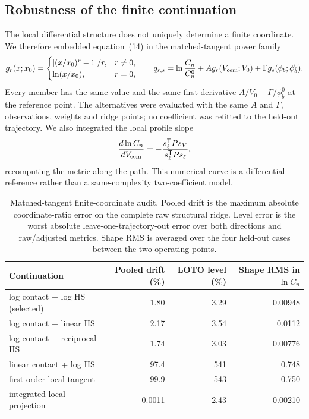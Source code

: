 
\subsection{Robustness of the finite continuation}

The local differential structure does not uniquely determine a finite
coordinate.  We therefore embedded equation~(14) in the matched-tangent
power family
\begin{equation}
 g_r(x;x_0)=
 \begin{cases}
 [(x/x_0)^r-1]/r, & r\ne0,\\
 \ln(x/x_0), & r=0,
 \end{cases}
 \qquad
 q_{r,s}=\ln\frac{C_n}{C_n^0}
 +A g_r(V_{\rm cem};V_0)
 +\Gamma g_s(\phi_b;\phi_b^0).
\end{equation}
Every member has the same value and the same first derivative
$A/V_0-\Gamma/\phi_b^0$ at the reference point.  The alternatives were
evaluated with the same $A$ and $\Gamma$, observations, weights and ridge
points; no coefficient was refitted to the held-out trajectory.  We also
integrated the local profile slope
\begin{equation}
 \frac{d\ln C_n}{dV_{\rm cem}}
 =-\frac{s_{\ell}^{\mathsf T}P s_V}
         {s_{\ell}^{\mathsf T}P s_{\ell}},
\end{equation}
recomputing the metric along the path.  This numerical curve is a
differential reference rather than a same-complexity two-coefficient model.

\begin{table}
\centering
\caption{Matched-tangent finite-coordinate audit.  Pooled drift is the
maximum absolute coordinate-ratio error on the complete raw structural
ridge.  Level error is the worst absolute leave-one-trajectory-out error
over both directions and raw/adjusted metrics.  Shape RMS is averaged over
the four held-out cases between the two operating points.}
\begin{tabular}{lrrr}
\toprule
Continuation & Pooled drift (\%) & LOTO level (\%) & Shape RMS in $\ln C_n$\\
\midrule
log contact + log HS (selected) & 1.80 & 3.29 & 0.00948\\
log contact + linear HS         & 2.17 & 3.54 & 0.0112\\
log contact + reciprocal HS     & 1.74 & 3.03 & 0.00776\\
linear contact + log HS         & 97.4 & 541  & 0.748\\
first-order local tangent       & 99.9 & 543  & 0.750\\
integrated local projection     & 0.0011 & 2.43 & 0.00210\\
\bottomrule
\end{tabular}
\end{table}

